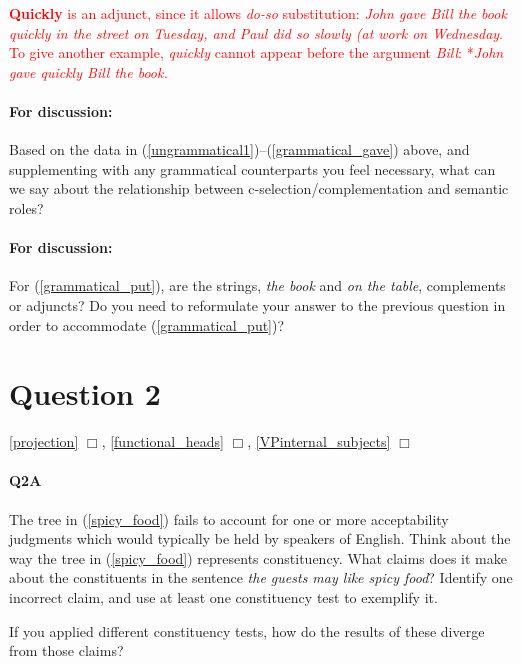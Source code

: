 \documentclass{article}
\begin{document}
\textcolor{red}{\textbf{Quickly} is an adjunct, since it allows \emph{do-so} substitution: \emph{John gave Bill the book quickly in the street on Tuesday, and Paul did so slowly (at work on Wednesday}. To give another example, \emph{quickly} cannot appear before the argument \emph{Bill}: *\emph{John gave quickly Bill the book.}}

\paragraph{For discussion:} Based on the data in (\ref{ungrammatical1})--(\ref{grammatical_gave}) above, and supplementing with any grammatical counterparts you feel necessary, what can we say about the relationship between c-selection/complementation and semantic roles?

\paragraph{For discussion:} For (\ref{grammatical_put}), are the strings, \emph{the book} and \emph{on the table}, complements or adjuncts? 
Do you need to reformulate your answer to the previous question in order to accommodate (\ref{grammatical_put})?
\begin{exe}
    \label{grammatical_put}
\end{exe}

\section*{Question 2}
\hfill{} \ref{projection} $\Box$, \ref{functional_heads} $\Box$, \ref{VPinternal_subjects} $\Box$

\paragraph{Q2A} The tree in (\ref{spicy_food}) fails to account for one or more acceptability judgments which would typically be held by speakers of English.
Think about the way the tree in (\ref{spicy_food}) represents constituency.
What claims does it make about the constituents in the sentence \emph{the guests may like spicy food}? Identify one incorrect claim, and use at least one constituency test to exemplify it.

If you applied different constituency tests, how do the results of these diverge from those claims?
\end{document}
